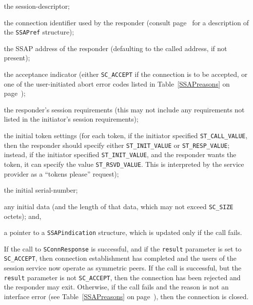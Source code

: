 \begin{describe}
\item[\verb"sd":] the session-descriptor;

\item[\verb"ref":]  the connection identifier used by the responder
(consult page~\pageref{SSAPref} for a description of the \verb"SSAPref"
structure);

\item[\verb"called":] the SSAP address of the responder (defaulting to the
called address, if not present);

\item[\verb"result":] the acceptance indicator
(either \verb"SC_ACCEPT" if the connection is to be accepted,
or one of the user-initiated abort error codes listed in
Table~\ref{SSAPreasons} on page~\pageref{SSAPreasons});

\item[\verb"requirements":] the responder's session requirements
(this may not include any requirements not listed in the initiator's session
requirements);

\item[\verb"settings":] the initial token settings
(for each token,
if the initiator specified \verb"ST_CALL_VALUE",
then the responder should specify either \verb"ST_INIT_VALUE" or
\verb"ST_RESP_VALUE";
instead,
if the initiator specified \verb"ST_INIT_VALUE",
and the responder wants the token,
it can specify the value \verb"ST_RSVD_VALUE".
This is interpreted by the service provider as a ``tokens please'' request);

\item[\verb"isn":] the initial serial-number;

\item[\verb"data"/\verb"cc":] any initial data (and the length of that data,
which may not exceed \verb"SC_SIZE" octets);
and,

\item[\verb"si":] a pointer to a \verb"SSAPindication" structure, which is
updated only if the call fails.
\end{describe}
If the call to \verb"SConnResponse" is successful,
and if the \verb"result" parameter is set to \verb"SC_ACCEPT",
then connection establishment has completed
and the users of the session service now operate as symmetric peers.
If the call is successful,
but the \verb"result" parameter is not \verb"SC_ACCEPT",
then the connection has been rejected and the responder may exit.
Otherwise, if the call fails and the reason is not an interface error
(see Table~\ref{SSAPreasons} on page~\pageref{SSAPreasons}),
then the connection is closed.

